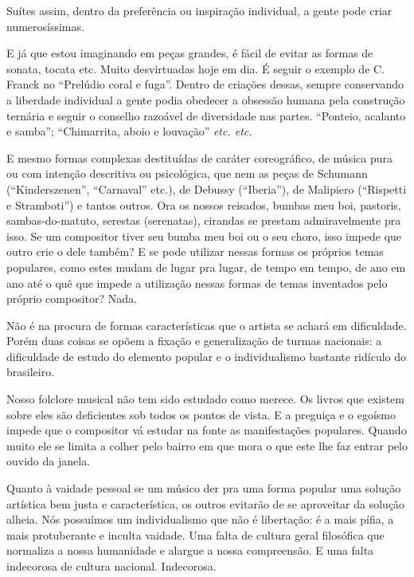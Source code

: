 Suítes assim, dentro da preferência ou inspiração individual, a gente
pode criar numerosíssimas.

E já que estou imaginando em peças grandes, é fácil de evitar as formas
de sonata, tocata etc. Muito desvirtuadas hoje em dia. É seguir o
exemplo de C.\,Franck no ``Prelúdio coral e fuga''. Dentro de criações
dessas, sempre conservando a liberdade individual a gente podia obedecer
a obsessão humana pela construção ternária e seguir o conselho razoável
de diversidade nas partes. ``Ponteio, acalanto e samba''; ``Chimarrita,
aboio e louvação'' \textit{etc. etc.}

E mesmo formas complexas destituídas de caráter coreográfico, de música
pura ou com intenção descritiva ou psicológica, que nem as peças de
Schumann (``Kinderszenen'', ``Carnaval'' etc.), de Debussy (``Iberia''), de
Malipiero (``Rispetti e Stramboti'') e tantos outros. Ora os nossos
reisados, bumbas meu boi, pastoris, sambas-do-matuto, serestas
(serenatas), cirandas se prestam admiravelmente pra isso. Se um
compositor tiver seu bumba meu boi ou o seu choro, isso impede que
outro crie o dele também? E se pode utilizar nessas formas os próprios
temas populares, como estes mudam de lugar pra lugar, de tempo em tempo,
de ano em ano até o quê que impede a utilização nessas formas de temas
inventados pelo próprio compositor? Nada.

Não é na procura de formas características que o artista se achará em
dificuldade. Porém duas coisas se opõem a fixação e generalização de
turmas nacionais: a dificuldade de estudo do elemento popular e o
individualismo bastante ridículo do brasileiro.

Nosso folclore musical não tem sido estudado como merece. Os livros que
existem sobre eles são deficientes sob todos os pontos de vista. E a
preguiça e o egoísmo impede que o compositor vá estudar na fonte as
manifestações populares. Quando muito ele se limita a colher pelo bairro
em que mora o que este lhe faz entrar pelo ouvido da janela.

Quanto à vaidade pessoal se um músico der pra uma forma popular uma
solução artística bem justa e característica, os outros evitarão de se
aproveitar da solução alheia. Nós possuímos um individualismo que não é
libertação: é a mais pífia, a mais protuberante e inculta vaidade. Uma
falta de cultura geral filosófica que normaliza a nossa humanidade e
alargue a nossa compreensão. E uma falta indecorosa de cultura nacional.
Indecorosa.

